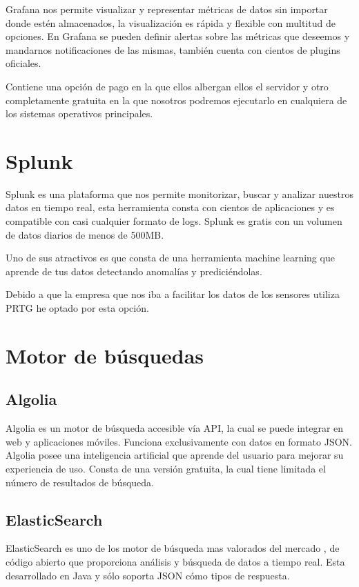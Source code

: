 Grafana nos permite visualizar y representar métricas de datos sin importar donde estén almacenados, la visualización es rápida y flexible con multitud de opciones. En Grafana se pueden definir alertas sobre las métricas que deseemos y mandarnos notificaciones de las mismas, también cuenta con cientos de plugins oficiales. 

Contiene una opción de pago en la que ellos albergan ellos el servidor y otro completamente gratuita en la que nosotros podremos ejecutarlo en cualquiera de los sistemas operativos principales.\cite{pagina:Grafana}
\section{Splunk}
Splunk es una plataforma que nos permite monitorizar, buscar y analizar nuestros datos en tiempo real, esta herramienta consta con cientos de aplicaciones y es compatible con casi cualquier formato de logs. Splunk es gratis con un volumen de datos diarios de menos de 500MB. \cite{pagina:Splunk}

Uno de sus atractivos es que consta de una herramienta machine learning que aprende de tus datos detectando anomalías y prediciéndolas.


Debido a que la empresa que nos iba a facilitar los datos de los sensores utiliza PRTG he optado por esta opción.

\section{Motor de búsquedas}

\subsection{Algolia}
Algolia es un motor de búsqueda accesible vía API, la cual se puede integrar en web y aplicaciones móviles. Funciona exclusivamente con datos en formato JSON. Algolia posee una inteligencia artificial que aprende del usuario para mejorar su experiencia de uso. Consta de una versión gratuita, la cual tiene limitada el número de resultados de búsqueda.\cite{pagina:Algolia}

\subsection{ElasticSearch}
ElasticSearch es uno de los motor de búsqueda mas valorados del mercado\cite{ranking:DB-Engines} , de código abierto que proporciona análisis y búsqueda de datos a tiempo real. Esta desarrollado en Java y sólo soporta JSON cómo tipos de respuesta.

